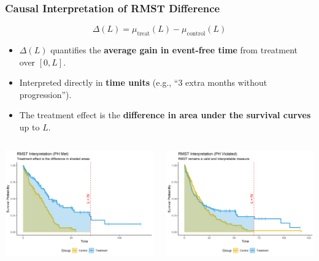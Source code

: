 \documentclass{beamer}
\begin{document}
\begin{frame}
\frametitle{Causal Interpretation of RMST Difference}
\begin{block}{}
\[
\Delta(L) = \mu_{\text{treat}}(L) - \mu_{\text{control}}(L)
\]

\begin{itemize}
  \item $\Delta(L)$ quantifies the \textbf{average gain in event-free time} from treatment over $[0,L]$.  
  \item Interpreted directly in \textbf{time units} (e.g., “3 extra months without progression”).  
  \item The treatment effect is the \textbf{difference in area under the survival curves} up to $L$.  
\end{itemize}
\end{block}

\begin{columns}[T,onlytextwidth]
  \begin{column}{0.5\textwidth}
    \centering
    \includegraphics[width=\textwidth, height=0.7\textwidth]{images/rmst_causal_plot_ph_met.png}
  \end{column}
  \begin{column}{0.5\textwidth}
    \centering
    \includegraphics[width=\textwidth, height=0.7\textwidth]{images/rmst_causal_plot_ph_violated.png}
  \end{column}
\end{columns}


\end{frame}
\end{document}
